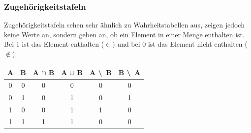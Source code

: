 \documentclass{article}
\begin{document}
	\subsubsection{Zugehörigkeitstafeln}
	Zugehörigkeitstafeln sehen sehr ähnlich zu Wahrheitstabellen aus, zeigen jedoch keine Werte an, sondern geben an, ob ein Element in einer Menge enthalten ist. Bei 1 ist das Element enthalten ($\in$) und bei 0 ist das Element nicht enthalten ($\notin$):\\
	\begin{tabular}{cccccc}
		\toprule
		A & B & A $\cap$ B & A $\cup$ B & A \textbackslash\, B & B \textbackslash\, A \\ \midrule
		0 & 0 & 0 & 0 & 0 & 0 \\ \hline
		0 & 1 & 0 & 1 & 0 & 1 \\ \hline
		1 & 0 & 0 & 1 & 1 & 0 \\ \hline
		1 & 1 & 1 & 1 & 0 & 0 \\
		\bottomrule
	\end{tabular}
\end{document}
